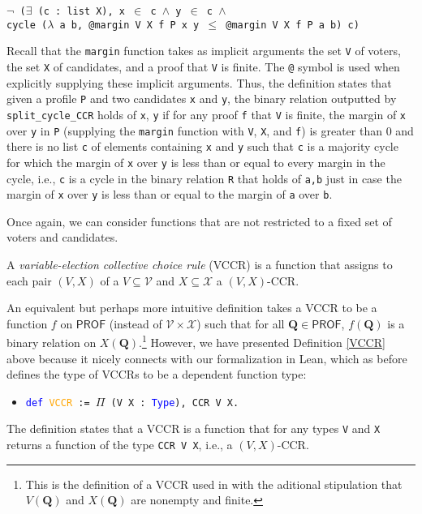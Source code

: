 \documentclass[runningheads]{llncs}
\begin{document}
\begin{example}
\begin{itemize}
    \texttt{$\neg$ ($\exists$ (c : list X), x $\in$ c $\wedge$ y $\in$ c $\wedge$}\\
    \texttt{cycle ($\lambda$ a b, @margin V X f P x y $\leq$ @margin V X f P a b) c)}
\end{itemize}
Recall that the \texttt{margin} function takes as implicit arguments the set \texttt{V} of voters, the set \texttt{X} of candidates, and a proof that \texttt{V} is finite. The \texttt{@} symbol is used when explicitly supplying these implicit arguments. Thus, the definition states that given a profile \texttt{P} and two candidates \texttt{x} and \texttt{y}, the binary relation outputted by \texttt{split\_cycle\_CCR} holds of \texttt{x}, \texttt{y} if for any proof \texttt{f} that \texttt{V} is finite, the margin of \texttt{x} over \texttt{y} in \texttt{P} (supplying the \texttt{margin} function with \texttt{V}, \texttt{X}, and \texttt{f}) is greater than 0 and there is no list \texttt{c} of elements containing \texttt{x} and \texttt{y} such that \texttt{c} is a majority cycle for which the margin of \texttt{x} over \texttt{y} is less than or equal to every margin in the cycle, i.e., \texttt{c} is a cycle in the binary relation \texttt{R} that holds of \texttt{a,b} just in case the margin of \texttt{x} over \texttt{y} is less than or equal to the margin of \texttt{a} over \texttt{b}.

\end{example}

Once again, we can consider functions that are not restricted to a fixed set of voters and candidates.

\begin{definition}\label{VCCR} \textnormal{A \emph{variable-election collective choice rule} (VCCR) is a function that assigns to each pair $(V,X)$ of a $V\subseteq\mathcal{V}$ and $X\subseteq\mathcal{X}$ a $(V,X)$-CCR.}%
\end{definition}

\noindent An equivalent but perhaps more intuitive definition takes a VCCR to be a function $f$ on $\mathsf{PROF}$ (instead of $\mathcal{V}\times\mathcal{X}$) such that for all $\mathbf{Q}\in\mathsf{PROF}$, $f(\mathbf{Q})$ is a binary relation on $X(\mathbf{Q})$.\footnote{This is the definition of a VCCR used in \cite{HP2020} with the aditional stipulation that $V(\mathbf{Q})$ and $X(\mathbf{Q})$ are nonempty and finite.} However, we have presented Definition \ref{VCCR} above because it nicely connects with our formalization in Lean, which as before defines the type of VCCRs to be a dependent function type:
\begin{itemize}
\item[] \texttt{\textcolor{blue}{def} \textcolor{orange}{VCCR} := $\Pi$ (V X : \textcolor{blue}{Type}), CCR V X.}
\end{itemize}
The definition states that a VCCR is a function that for any types \texttt{V} and \texttt{X} returns a function of the type \texttt{CCR V X}, i.e., a $(V,X)$-CCR.
\end{document}
